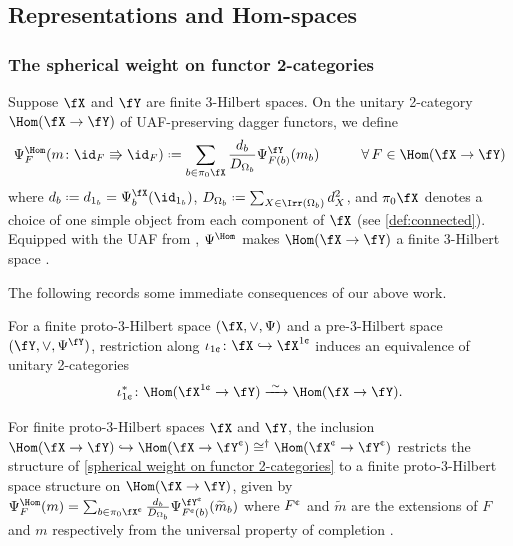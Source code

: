 \documentclass[12pt,reqno]{amsart}
\newcommand{\tld}[1]{{\widetilde{#1}}}
\newcommand{\cent}{\textup{\textcent}}
\DeclareRobustCommand{\coloneq}{\mathrel{\vcenter{\baselineskip0.5ex\lineskiplimit0pt\hbox{\scriptsize{\upshape.}}\hbox{\scriptsize{\upshape.}}}}=}
\begin{document}
\subsection{Representations and Hom-spaces}

\subsubsection{The spherical weight on functor 2-categories}

\begin{example}
  \label{spherical weight on functor 2-categories}
  Suppose $\fX$ and $\fY$ are finite 3-Hilbert spaces. On the unitary 2-category $\Hom(\fX\to \fY)$ of UAF-preserving dagger functors, we define
  \begin{equation}
    \label{eq:3HilbOnFun}
    \Psi^{\Hom}_F(m\colon \id_F\Rrightarrow \id_F)
    \coloneq
    \sum_{b\in\pi_0\fX}
    \frac{d_b}{D_{\Omega_b}}
    \Psi^\fY_{F(b)}(m_b)
    \qquad\quad
    \forall\,F\in\Hom(\fX\to \fY)
  \end{equation}
where $d_b\coloneq d_{1_b} = \Psi^\fX_b(\id_{1_b})$, $D_{\Omega_b} \coloneq \sum_{X\in \Irr(\Omega_b)} d_X^2$, and $\pi_0\fX$ denotes a choice of one simple object from each component of $\fX$ (see \cref{def:connected}).
Equipped with the UAF from \cite[Defn. 5.1]{bases}, $\Psi^{\Hom}$ makes $\Hom(\fX\to\fY)$ a finite 3-Hilbert space \cite[Lem. 5.3 and Prop. 5.4]{bases}.
\end{example}



The following records some immediate consequences of our above work.

\begin{corollary}\label{lem:local-cauchy-rep}
  For a finite proto-3-Hilbert space $(\fX,\vee,\Psi)$ and a pre-3-Hilbert space $(\fY,\vee,\Psi^\fY)$, restriction along $\iota_{1\cent}\colon\fX\hookrightarrow\fX^{1\cent}$ induces an equivalence of unitary 2-categories
  \[
    \iota_{1\cent}^*\colon\Hom(\fX^{1\cent}\to\fY) \xrightarrow{\;\sim\;} \Hom(\fX\to\fY).
  \]
\end{corollary}

\begin{corollary}\label{cor:proto-hom-weight}
  For finite proto-3-Hilbert spaces $\fX$ and $\fY$, the inclusion $\Hom(\fX\to\fY)\hookrightarrow\Hom(\fX\to\fY^\cent)\cong^\dag\Hom(\fX^\cent\to\fY^\cent)$ restricts the structure of \cref{spherical weight on functor 2-categories} to a finite proto-3-Hilbert space structure on $\Hom(\fX\to\fY)$, given by $\Psi^{\Hom}_F(m)=\sum_{b\in\pi_0\fX^\cent}\frac{d_b}{D_{\Omega_b}}\Psi^{\fY^\cent}_{F^\cent(b)}(\tld m_b)$ where $F^\cent$ and $\tld m$ are the extensions of $F$ and $m$ respectively from the universal property of completion \cite[\S4]{3Hilb}.
\end{corollary}
\end{document}
